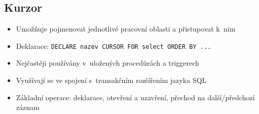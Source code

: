 \documentclass[a4paper,10pt]{article}
\begin{document}
    \subsection{Kurzor}
      \begin{itemize}
        \item Umožňuje pojmenovat jednotlivé pracovní oblasti a přistupovat k~nim
        \item Deklarace: \texttt{DECLARE nazev CURSOR FOR select ORDER BY ...}
        \item Nejčastěji používány v~uložených procedůrách a triggerech
        \item Využívají se ve spojení s~transakčním rozšířením jazyka SQL
        \item Základní operace: deklarace, otevření a uzavření, přechod na další/předchozí záznam
      \end{itemize}
\end{document}
